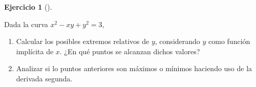 \documentclass[
  a4paper,
]{scrreport}
\providecommand{\tightlist}{%
  \setlength{\itemsep}{0pt}\setlength{\parskip}{0pt}}\usepackage{longtable,booktabs,array}
\theoremstyle{definition}
\newtheorem{exercise}{Ejercicio}[chapter]
\theoremstyle{remark}
\begin{document}
\begin{exercise}[]\protect\hypertarget{exr-derivada-implicita-5}{}\label{exr-derivada-implicita-5}

Dada la curva \(x^2-xy+y^2=3\),

\begin{enumerate}
\def\labelenumi{\alph{enumi}.}
\tightlist
\item
  Calcular los posibles extremos relativos de \(y\), considerando \(y\)
  como función implícita de \(x\). ¿En qué puntos se alcanzan dichos
  valores?
\item
  Analizar si lo puntos anteriores son máximos o mínimos haciendo uso de
  la derivada segunda.
\end{enumerate}

\end{exercise}
\end{document}

